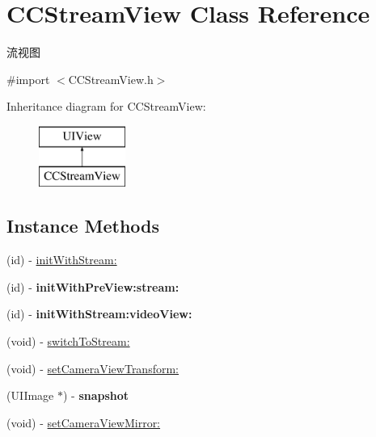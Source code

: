 \hypertarget{interface_c_c_stream_view}{}\section{C\+C\+Stream\+View Class Reference}
\label{interface_c_c_stream_view}


流视图  




{\ttfamily \#import $<$C\+C\+Stream\+View.\+h$>$}

Inheritance diagram for C\+C\+Stream\+View\+:\begin{figure}[H]
\begin{center}
\leavevmode
\includegraphics[height=2.000000cm]{interface_c_c_stream_view}
\end{center}
\end{figure}
\subsection*{Instance Methods}
\begin{DoxyCompactItemize}
\item 
(id) -\/ \hyperlink{interface_c_c_stream_view_a0a8eebb75951ae2ae5ae7ff9ec498b3d}{init\+With\+Stream\+:}
\item 
\mbox{\label{interface_c_c_stream_view_a77d49f2c879cdd8c0db134857df0b03a}} 
(id) -\/ {\bfseries init\+With\+Pre\+View\+:stream\+:}
\item 
\mbox{\label{interface_c_c_stream_view_a64194f8f54e0e1e9d2192fe2f94491bc}} 
(id) -\/ {\bfseries init\+With\+Stream\+:video\+View\+:}
\item 
(void) -\/ \hyperlink{interface_c_c_stream_view_a93cd41f06e817749a0ea635151333688}{switch\+To\+Stream\+:}
\item 
(void) -\/ \hyperlink{interface_c_c_stream_view_a459e2ceb67d1f1c40690d64b6ea609bb}{set\+Camera\+View\+Transform\+:}
\item 
\mbox{\label{interface_c_c_stream_view_a58ecfef01533b88dc54ea3939590a8d2}} 
(U\+I\+Image $\ast$) -\/ {\bfseries snapshot}
\item 
(void) -\/ \hyperlink{interface_c_c_stream_view_acc6bbb88b8529b7e2621ca78bcdee643}{set\+Camera\+View\+Mirror\+:}
\end{DoxyCompactItemize}
